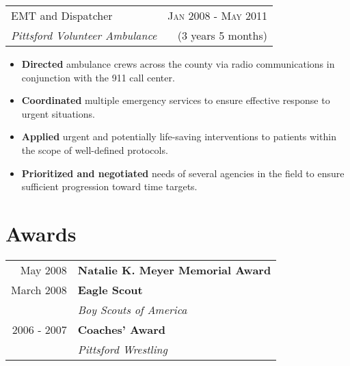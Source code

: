 \documentclass[10pt]{article} %
\begin{document}
{\begin{minipage}[t]{0.5\textwidth}
\begin{tabularx}{\linewidth}{ X r }
  {\large EMT and Dispatcher } & {\textsc{Jan 2008 - May 2011}} \\
  {\small\textit{Pittsford Volunteer Ambulance}} & {\small{(3 years 5 months)}}
\end{tabularx}
\begin{itemize}
  \item \small\textbf{Directed} ambulance crews across the county via radio communications in conjunction with the 911 call center.
  \item \small\textbf{Coordinated} multiple emergency services to ensure effective response to urgent situations.
  \item \small\textbf{Applied} urgent and potentially life-saving interventions to patients within the scope of well-defined protocols.
  \item \small\textbf{Prioritized and negotiated} needs of several agencies in the field to ensure sufficient progression toward time targets.
\end{itemize}


\section{Awards}

\begin{tabular}{rl}
May 2008	 & \textbf{Natalie K. Meyer Memorial Award}\\[3pt]

March 2008	 & \textbf{Eagle Scout}\\
            & \textit{Boy Scouts of America}\\[3pt]

2006 - 2007	 & \textbf{Coaches' Award}\\
& \textit{Pittsford Wrestling}
\end{tabular}



\end{minipage} %
\hfill
\begin{minipage}[t]{0.44\textwidth} 
\vspace{0pt} %



\end{minipage}}
\end{document}
